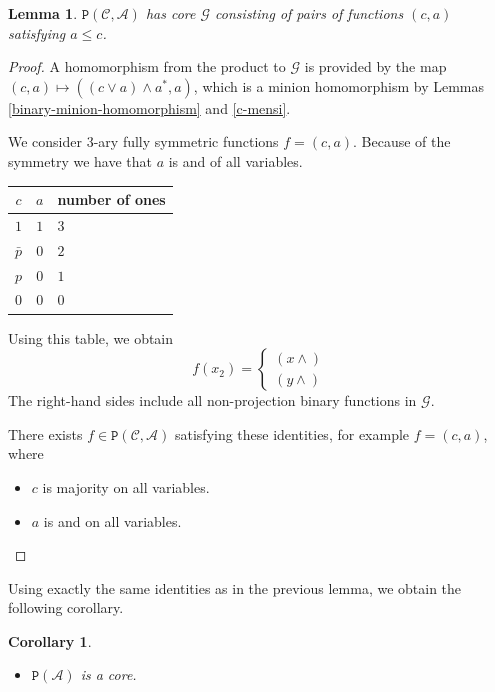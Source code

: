 \documentclass{amsart}
\numberwithin{equation}{section}
\theoremstyle{plain}
\newtheorem{lemma}[theorem]{Lemma}
\newtheorem{corollary}[theorem]{Corollary}
\theoremstyle{definition}
\def\clone#1{\mathcal{#1}}
\def\minion#1{\mathcal{#1}}
\def\Ac{\clone{A}}
\def\Cc{\clone{C}}
\def\C#1{{\mathtt{P}}(#1)}
\begin{document}
\begin{lemma}\label{ca} $\C{\Cc,\Ac}$ has core $\minion{G}$ consisting of pairs of functions $(c,a)$ satisfying $a \leq c$.
\end{lemma}
\begin{proof}
  A homomorphism from the product to $\minion{G}$ is provided by the map $(c,a)\mapsto ((c\vee a)\wedge a^*,a)$, which is a minion homomorphism by Lemmas \ref{binary-minion-homomorphism} and \ref{c-mensi}.
  
We consider $3$-ary fully symmetric functions $f= (c, a)$. 
Because of the symmetry we have that $a$ is and of all variables.

\begin{center}
\begin{tabular}{ |cc|l } 
 \hline
 $c$ & $a$ & number of ones \\ 
  \hline
     $1$ & $1$ & $3$ \\ 
     $\bar{p}$ & $0$ & $2$ \\ 
     $p$ & $0$ & $1$ \\ 
     $0$ & $0$ & $0$ \\ 
 \hline
\end{tabular}
\end{center}

Using this table, we obtain
$$f(x_2) = \left\{\begin{matrix}(x{\wedge}) \\ (y{\wedge})\end{matrix}\right.$$
The right-hand sides include all non-projection binary functions in $\minion{G}$.

There exists $f\in\C{\Cc,\Ac}$ satisfying these identities, for example $f=(c,a)$, where
\begin{itemize}
\item $c$ is majority on all variables.
\item $a$ is and on all variables.
\end{itemize}
\end{proof}

Using exactly the same identities as in the previous lemma, we obtain
the following corollary.

\begin{corollary}\label{cacor}
  \hfill
    \begin{itemize}
        \item $\C{\Ac}$ is a core.
    \end{itemize}
\end{corollary}
\end{document}
